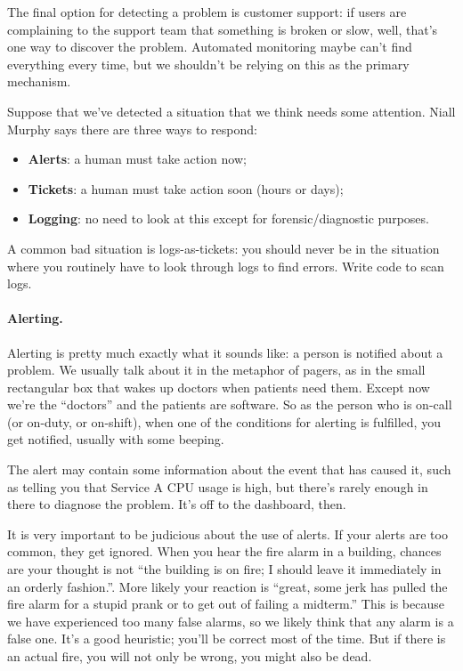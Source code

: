 \documentclass[a4paper]{report}
\begin{document}
The final option for detecting a problem is customer support: if users are complaining to the support team that something is broken or slow, well, that's one way to discover the problem. Automated monitoring maybe can't find everything every time, but we shouldn't be relying on this as the primary mechanism.

Suppose that we've detected a situation that we think needs some attention. Niall Murphy says there are three ways to respond:

\begin{itemize}
\item {\bf Alerts}: a human must take action now;
\item {\bf Tickets}: a human must take action soon (hours or days);
\item {\bf Logging}: no need to look at this except for forensic/diagnostic purposes.
\end{itemize}

A common bad situation is logs-as-tickets: you should never be in the
situation where you routinely have to look through logs to find
errors. Write code to scan logs.

\paragraph{Alerting.}
Alerting is pretty much exactly what it sounds like: a person is notified about a problem. We usually talk about it in the metaphor of pagers, as in the small rectangular box that wakes up doctors when patients need them. Except now we're the ``doctors'' and the patients are software. So as the person who is on-call (or on-duty, or on-shift), when one of the conditions for alerting is fulfilled, you get notified, usually with some beeping. 

The alert may contain some information about the event that has caused it, such as telling you that Service A CPU usage is high, but there's rarely enough in there to diagnose the problem. It's off to the dashboard, then.

It is very important to be judicious about the use of alerts. If your alerts are too common, they get ignored. When you hear the fire alarm in a building, chances are your thought is not ``the building is on fire; I should leave it immediately in an orderly fashion.''. More likely your reaction is ``great, some jerk has pulled the fire alarm for a stupid prank or to get out of failing a midterm.'' This is because we have experienced too many false alarms, so we likely think that any alarm is a false one. It's a good heuristic; you'll be correct most of the time. But if there is an actual fire, you will not only be wrong, you might also be dead.
\end{document}
